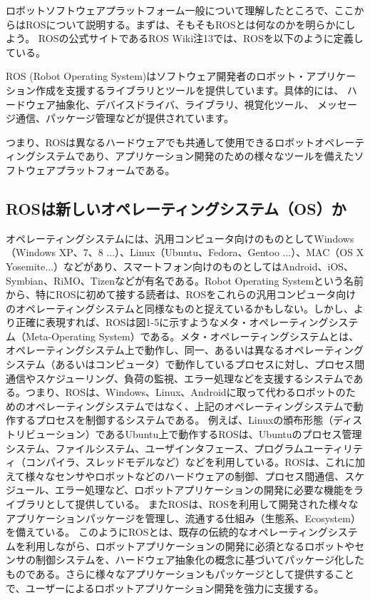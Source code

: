 ロボットソフトウェアプラットフォーム一般について理解したところで、ここからはROSについて説明する。まずは、そもそもROSとは何なのかを明らかにしよう。
ROSの公式サイトであるROS Wiki注13では、ROSを以下のように定義している。

ROS (Robot Operating System)はソフトウェア開発者のロボット・アプリケーション作成を支援するライブラリとツールを提供しています。具体的には、 ハードウェア抽象化、デバイスドライバ、ライブラリ、視覚化ツール、 メッセージ通信、パッケージ管理などが提供されています。

つまり、ROSは異なるハードウェアでも共通して使用できるロボットオペレーティングシステムであり、アプリケーション開発のための様々なツールを備えたソフトウェアプラットフォームである。

\subsection{ROSは新しいオペレーティングシステム（OS）か}

オペレーティングシステムには、汎用コンピュータ向けのものとしてWindows（Windows XP、7、8 ...）、Linux（Ubuntu、Fedora、Gentoo ...）、MAC（OS X Yosemite...）などがあり、スマートフォン向けのものとしてはAndroid、iOS、Symbian、RiMO、Tizenなどが有名である。Robot Operating Systemという名前から、特にROSに初めて接する読者は、ROSをこれらの汎用コンピュータ向けのオペレーティングシステムと同様なものと捉えているかもしない。しかし、より正確に表現すれば、ROSは図1-5に示すようなメタ・オペレーティングシステム（Meta-Operating System）である。メタ・オペレーティングシステムとは、オペレーティングシステム上で動作し、同一、あるいは異なるオペレーティングシステム（あるいはコンピュータ）で動作しているプロセスに対し、プロセス間通信やスケジューリング、負荷の監視、エラー処理などを支援するシステムである。つまり、ROSは、Windows、Linux、Androidに取って代わるロボットのためのオペレーティングシステムではなく、上記のオペレーティングシステムで動作するプロセスを制御するシステムである。
例えば、Linuxの頒布形態（ディストリビューション）であるUbuntu上で動作するROSは、Ubuntuのプロセス管理システム、ファイルシステム、ユーザインタフェース、プログラムユーティリティ（コンパイラ、スレッドモデルなど）などを利用している。ROSは、これに加えて様々なセンサやロボットなどのハードウェアの制御、プロセス間通信、スケジュール、エラー処理など、ロボットアプリケーションの開発に必要な機能をライブラリとして提供している。
またROSは、ROSを利用して開発された様々なアプリケーションパッケージを管理し、流通する仕組み（生態系、Ecosystem）を備えている。
このようにROSとは、既存の伝統的なオペレーティングシステムを利用しながら、ロボットアプリケーションの開発に必須となるロボットやセンサの制御システムを、ハードウェア抽象化の概念に基づいてパッケージ化したものである。さらに様々なアプリケーションもパッケージとして提供することで、ユーザーによるロボットアプリケーション開発を強力に支援する。

